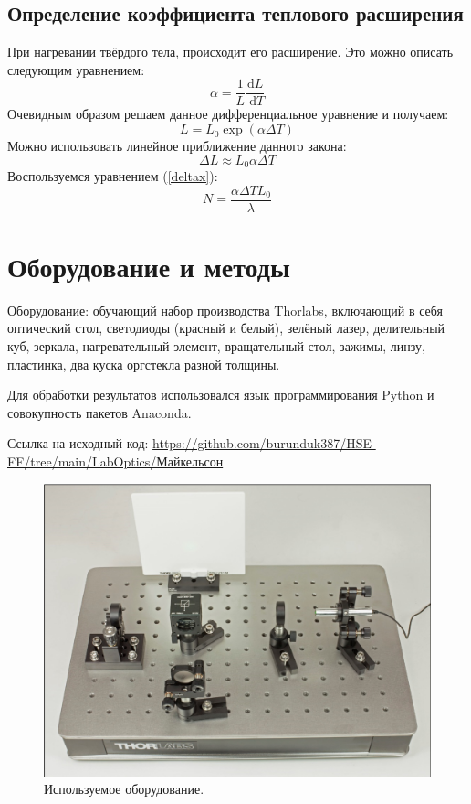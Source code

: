 \documentclass[a4paper, 12pt]{article}
\begin{document}
	\subsection*{Определение коэффициента теплового расширения}
	При нагревании твёрдого тела, происходит его расширение. Это можно описать следующим уравнением:
	\begin{equation}
		\alpha=\frac{1}{L} \frac{\mathrm{d} L}{\mathrm{~d} T}
	\end{equation}
	Очевидным образом решаем данное дифференциальное уравнение и получаем:
	\begin{equation}
		L = L_0 \exp(\alpha \Delta T)
	\end{equation}
	Можно использовать линейное приближение данного закона:
	\begin{equation}
		\Delta L \approx L_0 \alpha \Delta T
	\end{equation}
	Воспользуемся уравнением (\ref{deltax}):
	\begin{equation}\label{hot}
		N = \frac{\alpha \Delta T L_0}{\lambda}
	\end{equation}
	\section*{Оборудование и методы}
	Оборудование: обучающий набор производства Thorlabs, включающий в себя оптический стол, светодиоды (красный и белый), зелёный лазер, делительный куб, зеркала, нагревательный элемент, вращательный стол, зажимы, линзу, пластинка, два куска оргстекла разной толщины.
	
	Для обработки результатов использовался язык программирования Python и совокупность пакетов Anaconda.
	
	Ссылка на исходный код:
	\newline \href{https://github.com/burunduk387/HSE-FF/tree/main/LabOptics/Майкельсон}{https://github.com/burunduk387/HSE-FF/tree/main/LabOptics/Майкельсон}
	\begin{figure}[H]
	\centering
	\includegraphics[width=0.75\linewidth]{Equip.png}
	\caption{Используемое оборудование.}
	\label{fig:2}
	\end{figure}
\end{document}
